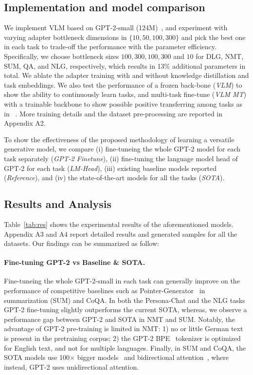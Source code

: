 \subsection{Implementation and model comparison} We implement VLM based on GPT-2-small (124M)~\cite{Wolf2019HuggingFacesTS}, and experiment with varying adapter bottleneck dimensions in $\{10, 50, 100, 300 \}$ and pick the best one in each task to trade-off the performance with the parameter efficiency. Specifically, we choose bottleneck sizes $100, 300, 100, 300$ and $10$ for DLG, NMT, SUM, QA, and NLG, respectively, which results in 13\% additional parameters in total. We ablate the adapter training with and without knowledge distillation and task embeddings. We also test the performance of a frozen back-bone (\textit{VLM}) to show the ability to continuously learn tasks, and multi-task fine-tune (\textit{VLM MT}) with a trainable backbone to show possible positive transferring among tasks as in ~\citet{stickland2019bert}. More training details and the dataset pre-processing are reported in Appendix A2.

To show the effectiveness of the proposed methodology of learning a versatile generative model, we compare (i) fine-tuneing the whole GPT-2 model for each task separately (\textit{GPT-2 Finetune}), (ii) fine-tuning the language model head of GPT-2 for each task (\textit{LM-Head}), (iii) existing baseline models reported (\textit{Reference}), and (iv) the state-of-the-art models for all the tasks (\textit{SOTA}). 

\subsection{Results and Analysis}
Table~\ref{tab:res} shows the experimental results of the aforementioned models. Appendix A3 and A4 report detailed results and generated samples for all the datasets. Our findings can be summarized as follow: 

\paragraph{Fine-tuning GPT-2 vs Baseline \& SOTA.} Fine-tuneing the whole GPT-2-small in each task can generally improve on the performance of competitive baselines such as Pointer-Generator~\cite{see2017get} in summarization (SUM) and CoQA. In both the Persona-Chat and the NLG tasks GPT-2 fine-tuning slightly outperforms the current SOTA, whereas, we observe a performance gap between GPT-2 and SOTA in NMT and SUM. Notably, the advantage of GPT-2 pre-training is limited in NMT: 1) no or little German text is present in the pretraining corpus; 2) the GPT-2 BPE~\cite{sennrich2016neural} tokenizer is optimized for English text, and not for multiple languages. Finally, in SUM and CoQA, the SOTA models use 100$\times$ bigger models~\cite{raffel2019exploring} and bidirectional attention~\cite{dong2019unified}, where instead, GPT-2 uses unidirectional attention. 

